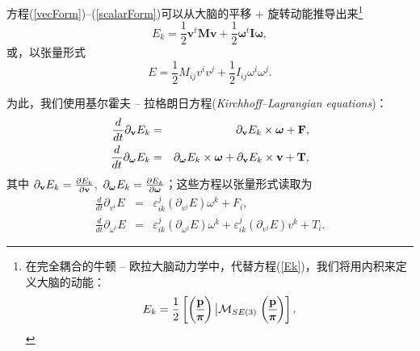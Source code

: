 \documentclass[11pt,fontset=founder]{ctexart}
\begin{document}
方程(\ref{vecForm})–(\ref{scalarForm})可以从大脑的平移 + 旋转动能推导出来\footnote{%
在完全耦合的牛顿 -- 欧拉大脑动力学中，代替方程(\ref {Ek})，我们将用内积来定义大脑的动能：
\begin{equation*}
E_{k}=\frac{1}{2}\left[ \QOVERD( ) {\mathbf{p}}{\mathbf{\pi }}\left|
\mathcal{M}_{SE(3)}\right. \QOVERD( ) {\mathbf{p}}{\mathbf{\pi }}\right] .
\end{equation*}
}
\begin{equation}
E_{k}={\frac{1}{2}}\mathbf{v}^{t}\mathbf{Mv}+{\frac{1}{2}}\mathbf{\omega }%
^{t}\mathbf{I\omega },  \label{Ek}
\end{equation}
或，以张量形式
\begin{equation*}
E={\frac{1}{2}}M_{ij}{v}^{i}{v}^{j}+{\frac{1}{2}}I_{ij}{\omega}%
^{i}{\omega}^{j}.
\end{equation*}

为此，我们使用基尔霍夫 -- 拉格朗日方程(\emph{Kirchhoff--Lagrangian equations})：
\begin{eqnarray}
\frac{d}{{dt}}\partial _{\mathbf{v}}E_{k} &=&\partial _{\mathbf{v}%
}E_{k}\times \mathbf{\omega }+\mathbf{F},  \label{Kirch} \\
{\frac{d}{{dt}}}\partial _{\mathbf{\omega }}E_{k} &=&\partial _{\mathbf{%
\omega }}E_{k}\times \mathbf{\omega }+\partial _{\mathbf{v}}E_{k}\times
\mathbf{v}+\mathbf{T},  \notag
\end{eqnarray}
其中 $\partial _{\mathbf{v}}E_{k}=\frac{\partial E_{k}}{\partial \mathbf{v}}%
,~\partial _{\mathbf{\omega }}E_{k}=\frac{\partial E_{k}}{\partial \mathbf{%
\omega }}$；这些方程以张量形式读取为
\begin{eqnarray*}
\frac{d}{dt}\partial _{v^{i}}E &=&\varepsilon _{ik}^{j}\left( \partial
_{v^{j}}E\right) \omega ^{k}+F_{i}, \\
\frac{d}{dt}\partial _{{\omega }^{i}}E &=&\varepsilon _{ik}^{j}\left(
\partial _{{\omega }^{j}}E\right) {\omega }^{k}+\varepsilon _{ik}^{j}\left(
\partial _{v^{j}}E\right) v^{k}+T_{i}.
\end{eqnarray*}
\end{document}
